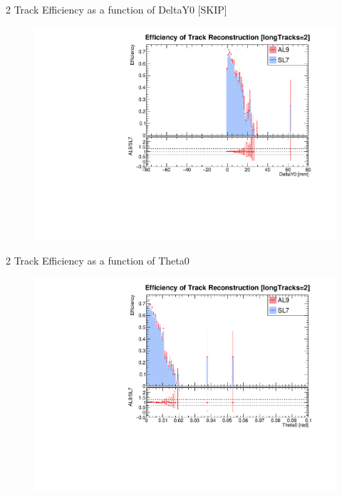 \begin{frame}{2 Track Efficiency as a function of DeltaY0 [SKIP]}
    \begin{figure}
        \includegraphics[width=\linewidth]{./output/Effi_eq2_DeltaY0.pdf}
    \end{figure}
\end{frame}
\begin{frame}{2 Track Efficiency as a function of Theta0}
    \begin{figure}
        \includegraphics[width=\linewidth]{./output/Effi_eq2_Theta0.pdf}
    \end{figure}
\end{frame}
